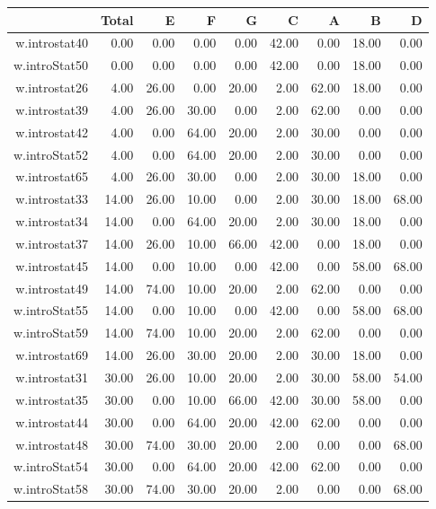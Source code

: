 \documentclass[12pt,english,nohyper]{tufte-handout}\usepackage[]{graphicx}\usepackage[]{color}
\begin{document}
\begin{longtable}{rrrrrrrrr}
  \hline
 & Total & E & F & G & C & A & B & D \\ 
  \hline
w.introstat40 & 0.00 & 0.00 & 0.00 & 0.00 & 42.00 & 0.00 & 18.00 & 0.00 \\ 
  w.introStat50 & 0.00 & 0.00 & 0.00 & 0.00 & 42.00 & 0.00 & 18.00 & 0.00 \\ 
  w.introstat26 & 4.00 & 26.00 & 0.00 & 20.00 & 2.00 & 62.00 & 18.00 & 0.00 \\ 
  w.introstat39 & 4.00 & 26.00 & 30.00 & 0.00 & 2.00 & 62.00 & 0.00 & 0.00 \\ 
  w.introstat42 & 4.00 & 0.00 & 64.00 & 20.00 & 2.00 & 30.00 & 0.00 & 0.00 \\ 
  w.introStat52 & 4.00 & 0.00 & 64.00 & 20.00 & 2.00 & 30.00 & 0.00 & 0.00 \\ 
  w.introstat65 & 4.00 & 26.00 & 30.00 & 0.00 & 2.00 & 30.00 & 18.00 & 0.00 \\ 
  w.introstat33 & 14.00 & 26.00 & 10.00 & 0.00 & 2.00 & 30.00 & 18.00 & 68.00 \\ 
  w.introstat34 & 14.00 & 0.00 & 64.00 & 20.00 & 2.00 & 30.00 & 18.00 & 0.00 \\ 
  w.introstat37 & 14.00 & 26.00 & 10.00 & 66.00 & 42.00 & 0.00 & 18.00 & 0.00 \\ 
  w.introstat45 & 14.00 & 0.00 & 10.00 & 0.00 & 42.00 & 0.00 & 58.00 & 68.00 \\ 
  w.introstat49 & 14.00 & 74.00 & 10.00 & 20.00 & 2.00 & 62.00 & 0.00 & 0.00 \\ 
  w.introStat55 & 14.00 & 0.00 & 10.00 & 0.00 & 42.00 & 0.00 & 58.00 & 68.00 \\ 
  w.introStat59 & 14.00 & 74.00 & 10.00 & 20.00 & 2.00 & 62.00 & 0.00 & 0.00 \\ 
  w.introstat69 & 14.00 & 26.00 & 30.00 & 20.00 & 2.00 & 30.00 & 18.00 & 0.00 \\ 
  w.introstat31 & 30.00 & 26.00 & 10.00 & 20.00 & 2.00 & 30.00 & 58.00 & 54.00 \\ 
  w.introstat35 & 30.00 & 0.00 & 10.00 & 66.00 & 42.00 & 30.00 & 58.00 & 0.00 \\ 
  w.introstat44 & 30.00 & 0.00 & 64.00 & 20.00 & 42.00 & 62.00 & 0.00 & 0.00 \\ 
  w.introstat48 & 30.00 & 74.00 & 30.00 & 20.00 & 2.00 & 0.00 & 0.00 & 68.00 \\ 
  w.introStat54 & 30.00 & 0.00 & 64.00 & 20.00 & 42.00 & 62.00 & 0.00 & 0.00 \\ 
  w.introStat58 & 30.00 & 74.00 & 30.00 & 20.00 & 2.00 & 0.00 & 0.00 & 68.00 \\ 

\end{longtable}
\end{document}
